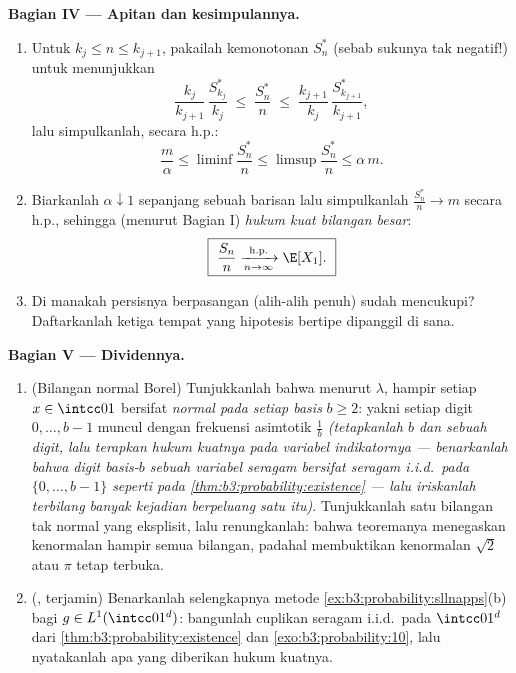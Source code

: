 \begin{problem}
\medskip
\noindent\textbf{Bagian IV --- Apitan dan kesimpulannya.}
\begin{enumerate}[resume]
  \item Untuk $k_j \leq n \leq k_{j+1}$, pakailah kemonotonan
        $S^*_n$ (sebab sukunya tak negatif!) untuk menunjukkan
        \[
        \frac{k_j}{k_{j+1}}\,\frac{S^*_{k_j}}{k_j}
        \;\leq\; \frac{S^*_n}{n} \;\leq\;
        \frac{k_{j+1}}{k_j}\,\frac{S^*_{k_{j+1}}}{k_{j+1}},
        \]
        lalu simpulkanlah, secara h.p.:
        \[
        \frac m\alpha \leq \liminf\frac{S^*_n}n \leq
        \limsup\frac{S^*_n}n \leq \alpha\,m .
        \]
  \item Biarkanlah $\alpha \downarrow 1$ sepanjang sebuah barisan lalu
        simpulkanlah $\frac{S_n^*}n \to m$ secara h.p., sehingga (menurut Bagian I)
        \emph{hukum kuat bilangan besar}:
        \[
        \boxed{\ \frac{S_n}{n}
        \xrightarrow[n\to\infty]{\text{h.p.}} \E[X_1].\ }
        \]
  \item Di manakah persisnya  berpasangan (alih-alih
         penuh) sudah mencukupi? Daftarkanlah ketiga tempat
        yang hipotesis bertipe  dipanggil di sana.
\end{enumerate}

\medskip
\noindent\textbf{Bagian V --- Dividennya.}
\begin{enumerate}[resume]
  \item (Bilangan normal Borel) Tunjukkanlah bahwa menurut
        $\lambda$, hampir setiap $x \in \intcc01$ bersifat
        \emph{normal pada setiap basis} $b \geq 2$: yakni setiap digit
        $0, \dots, b-1$ muncul dengan frekuensi asimtotik
        $\frac1b$ \emph{(tetapkanlah $b$ dan sebuah digit, lalu terapkan
        hukum kuatnya pada variabel indikatornya --- benarkanlah
        bahwa digit basis-$b$ sebuah variabel seragam bersifat
        seragam i.i.d.\ pada $\{0,\dots,b-1\}$ seperti pada
        \cref{thm:b3:probability:existence} --- lalu
        iriskanlah terbilang banyak kejadian
        berpeluang satu itu)}. Tunjukkanlah satu bilangan tak normal yang eksplisit,
        lalu renungkanlah: bahwa teoremanya menegaskan kenormalan hampir
        semua bilangan, padahal membuktikan kenormalan $\sqrt2$ atau
        $\pi$ tetap terbuka.
  \item (, terjamin) Benarkanlah selengkapnya
        metode \cref{ex:b3:probability:sllnapps}(b) bagi
        $g \in L^1(\intcc01^d)$: bangunlah cuplikan seragam
        i.i.d.\ pada $\intcc01^d$ dari
        \cref{thm:b3:probability:existence} dan
        \cref{exo:b3:probability:10}, lalu nyatakanlah apa yang
        diberikan hukum kuatnya.
\end{enumerate}


\end{problem}

